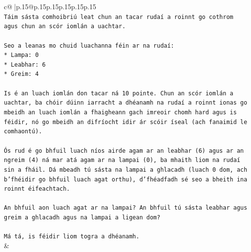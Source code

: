 \documentclass{article}
\begin{document}
{\begin{supertabular}{c@{$\;$}|p{.15\linewidth}@{}p{.15\linewidth}p{.15\linewidth}p{.15\linewidth}p{.15\linewidth}p{.15\linewidth}}
{{{\\ 
\texttt{Táim sásta comhoibriú leat chun an tacar rudaí a roinnt go cothrom agus chun an scór iomlán a uachtar.} \\
\\ 
\texttt{Seo a leanas mo chuid luachanna féin ar na rudaí:} \\
\texttt{*   Lampa: 0} \\
\texttt{*   Leabhar: 6} \\
\texttt{*   Greim: 4} \\
\\ 
\texttt{Is é an luach iomlán don tacar ná 10 pointe. Chun an scór iomlán a uachtar, ba chóir dúinn iarracht a dhéanamh na rudaí a roinnt ionas go mbeidh an luach iomlán a fhaigheann gach imreoir chomh hard agus is féidir, nó go mbeidh an difríocht idir ár scóir íseal (ach fanaimid le comhaontú).} \\
\\ 
\texttt{Ós rud é go bhfuil luach níos airde agam ar an leabhar (6) agus ar an ngreim (4) ná mar atá agam ar na lampai (0), ba mhaith liom na rudaí sin a fháil. Dá mbeadh tú sásta na lampai a ghlacadh (luach 0 dom, ach b'fhéidir go bhfuil luach agat orthu), d'fhéadfadh sé seo a bheith ina roinnt éifeachtach.} \\
\\ 
\texttt{An bhfuil aon luach agat ar na lampai? An bhfuil tú sásta leabhar agus greim a ghlacadh agus na lampai a ligean dom?} \\
\\ 
\texttt{Má tá, is féidir liom togra a dhéanamh.} \\
            }
        }
    }
    & \\ \\


\end{supertabular}}
\end{document}
